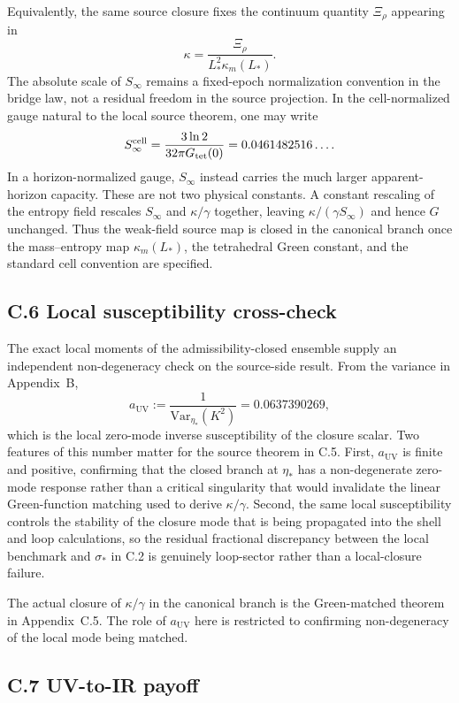 \documentclass[11pt]{article}
\begin{document}
Equivalently, the same source closure fixes the continuum quantity $\Xi_\rho$ appearing in
\[
\kappa=\frac{\Xi_\rho}{L_*^2\kappa_m(L_*)}.
\]
The absolute scale of $S_\infty$ remains a fixed-epoch normalization convention in the bridge law, not a residual freedom in the source projection. In the cell-normalized gauge natural to the local source theorem, one may write
\[
S_{\infty}^{\rm cell}
=
\frac{3\ln2}{32\pi G_{\mathrm{tet}}(0)}
=
0.0461482516\ldots .
\]
In a horizon-normalized gauge, $S_\infty$ instead carries the much larger apparent-horizon capacity. These are not two physical constants. A constant rescaling of the entropy field rescales $S_\infty$ and $\kappa/\gamma$ together, leaving $\kappa/(\gamma S_\infty)$ and hence $G$ unchanged. Thus the weak-field source map is closed in the canonical branch once the mass--entropy map $\kappa_m(L_*)$, the tetrahedral Green constant, and the standard cell convention are specified.

\subsection*{C.6 Local susceptibility cross-check}

The exact local moments of the admissibility-closed ensemble supply an independent non-degeneracy check on the source-side result. From the variance in Appendix~B,
\[
a_{\mathrm{UV}}
:=
\frac{1}{\mathrm{Var}_{\eta_*}(K^2)}
=
0.0637390269,
\]
which is the local zero-mode inverse susceptibility of the closure scalar. Two features of this number matter for the source theorem in C.5. First, $a_{\mathrm{UV}}$ is finite and positive, confirming that the closed branch at $\eta_*$ has a non-degenerate zero-mode response rather than a critical singularity that would invalidate the linear Green-function matching used to derive $\kappa/\gamma$. Second, the same local susceptibility controls the stability of the closure mode that is being propagated into the shell and loop calculations, so the residual fractional discrepancy between the local benchmark and $\sigma_*$ in C.2 is genuinely loop-sector rather than a local-closure failure.

The actual closure of $\kappa/\gamma$ in the canonical branch is the Green-matched theorem in Appendix~C.5. The role of $a_{\mathrm{UV}}$ here is restricted to confirming non-degeneracy of the local mode being matched.

\subsection*{C.7 UV-to-IR payoff}
\end{document}
